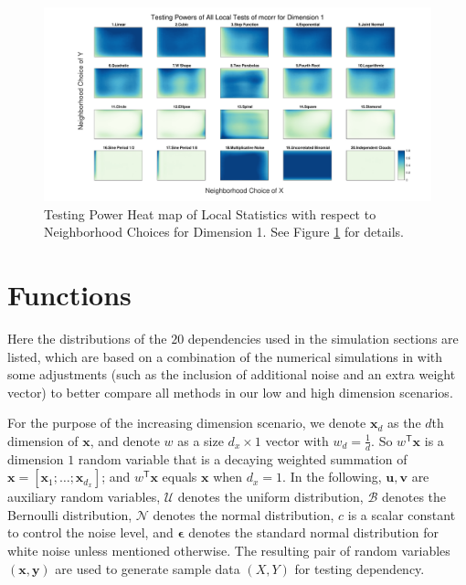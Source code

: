 \documentclass[11pt]{article}
\newcommand{\T}{^{\ensuremath{\mathsf{T}}}}           %
\providecommand{\mb}[1]{\boldsymbol{#1}}
\providecommand{\mc}[1]{\mathcal{#1}}
\newcommand{\jv}[1]{{\color{red}{#1}}}
\newcommand{\cs}[1]{{\color{blue}{#1}}}
\begin{document}
\begin{figure}[htbp]
\includegraphics[width=1.0\textwidth]{../Figures/Fig2}
\caption{Testing Power Heat map of Local Statistics with respect to Neighborhood Choices for Dimension 1. See Figure \ref{figSim2} for details. \jv{fix (1,1) here too please?}
\cs{do you mean the smallest scale should be at the lowest left corner? it is already the case here. }
}
\label{figSim2}
\end{figure}


\section{Functions}
\label{appen:function}

Here the distributions of the $20$ dependencies used in the simulation sections are listed, which are based on a combination of the numerical simulations in \cite{SzekelyRizzoBakirov2007, SimonTibshirani2012, SimonTibshirani2012, GorfineHellerHeller2012} with some adjustments (such as the inclusion of additional noise and an extra weight vector) to better compare all methods in our low and high dimension scenarios.

For the purpose of the increasing dimension scenario, we denote $\mb{x}_{d}$ as the $d$th dimension of $\mb{x}$, and denote $w$ as a size $d_{x} \times 1$ vector with $w_{d}=\frac{1}{d}$. So $w\T \mb{x}$ is a dimension $1$ random variable that is a decaying weighted summation of $\mb{x}=[\mb{x}_{1};\ldots;\mb{x}_{d_{x}}]$; and $w\T \mb{x}$ equals $\mb{x}$ when $d_{x}=1$. In the following, $\mb{u}, \mb{v}$ are auxiliary random variables, $\mc{U}$ denotes the uniform distribution, $\mc{B}$ denotes the Bernoulli distribution, $\mc{N}$ denotes the normal distribution, $c$ is a scalar constant to control the noise level, and $\mb{\epsilon}$ denotes the standard normal distribution for white noise unless mentioned otherwise. The resulting pair of random variables $(\mb{x},\mb{y})$ are used to generate sample data $(X,Y)$ for testing dependency.
\end{document}
